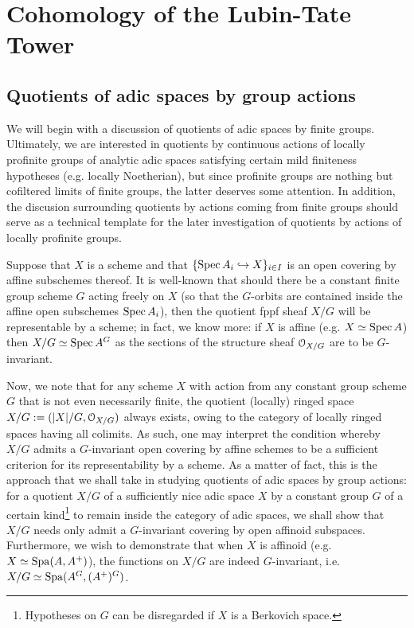 \section{Cohomology of the Lubin-Tate Tower}
    \subsection{Quotients of adic spaces by group actions}
        We will begin with a discussion of quotients of adic spaces by finite groups. Ultimately, we are interested in quotients by continuous actions of locally profinite groups of analytic adic spaces satisfying certain mild finiteness hypotheses (e.g. locally Noetherian), but since profinite groups are nothing but cofiltered limits of finite groups, the latter deserves some attention. In addition, the discusion surrounding quotients by actions coming from finite groups should serve as a technical template for the later investigation of quotients by actions of locally profinite groups. 
        
        Suppose that $X$ is a scheme and that $\{\operatorname{Spec} A_i \hookrightarrow X\}_{i \in I}$ is an open covering by affine subschemes thereof. It is well-known that should there be a constant finite group scheme $G$ acting freely on $X$ (so that the $G$-orbits are contained inside the affine open subschemes $\operatorname{Spec} A_i$), then the quotient fppf sheaf $X/G$ will be representable by a scheme; in fact, we know more: if $X$ is affine (e.g. $X \simeq \operatorname{Spec} A$) then $X/G \simeq \operatorname{Spec} A^G$ as the sections of the structure sheaf $\mathcal{O}_{X/G}$ are to be $G$-invariant. 
            
        Now, we note that for any scheme $X$ with action from any constant group scheme $G$ that is not even necessarily finite, the quotient (locally) ringed space $X/G := (|X|/G, \mathcal{O}_{X/G})$ always exists, owing to the category of locally ringed spaces having all colimits. As such, one may interpret the condition whereby $X/G$ admits a $G$-invariant open covering by affine schemes to be a sufficient criterion for its representability by a scheme. As a matter of fact, this is the approach that we shall take in studying quotients of adic spaces by group actions: for a quotient $X/G$ of a sufficiently nice adic space $X$ by a constant group $G$ of a certain kind\footnote{Hypotheses on $G$ can be disregarded if $X$ is a Berkovich space.} to remain inside the category of adic spaces, we shall show that $X/G$ needs only admit a $G$-invariant covering by open affinoid subspaces. Furthermore, we wish to demonstrate that when $X$ is affinoid (e.g. $X \simeq \operatorname{Spa}(A, A^+)$), the functions on $X/G$ are indeed $G$-invariant, i.e. $X/G \simeq \operatorname{Spa}(A^G, (A^+)^G)$. 
        
